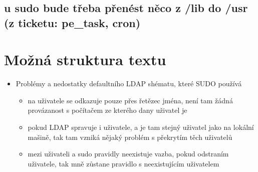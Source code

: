 \documentclass[12pt,a4paper,titlepage,final]{article}
\begin{document}
\subsection{u sudo bude třeba přenést něco z /lib do /usr (z ticketu: pe\_task,
									cron)}
	


\section*{Možná struktura textu}
\begin{itemize}
	\item Problémy a nedostatky defaultního LDAP shématu, které SUDO používá
	\begin{itemize}
					\item na uživatele se odkazuje pouze přes řetězec jména, není tam žádná
									provázanost s počítačem ze kterého dany uživatel je
					\item pokud LDAP spravuje i uživatele, a je tam stejný uživatel jako na
									lokální mašině, tak tam vzniká nějaký problém s překrytím těch uživatelů
					\item mezi uživateli a sudo pravidly neexistuje vazba, pokud odstraním
									uživatele, tak mně zůstane pravidlo s neexistujícím uživatelem
	\end{itemize}
\end{itemize} 
\end{document}
